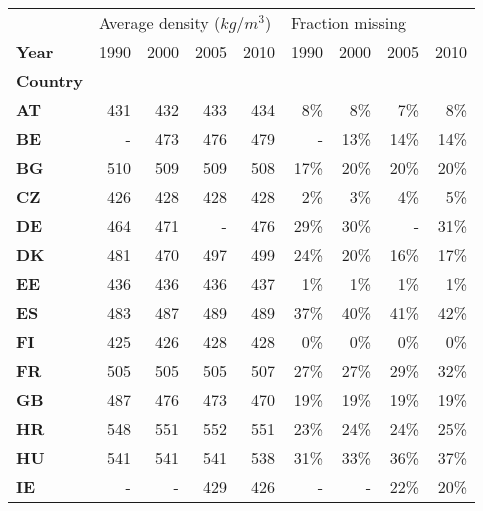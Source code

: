 \begin{tabular}{lrrrr|rrrr}
\toprule
{} & \multicolumn{4}{l}{Average density ($kg/m^3$)} & \multicolumn{4}{l}{Fraction missing} \\
\textbf{Year} &                       1990 & 2000 & 2005 & 2010 &             1990 &  2000 &  2005 &  2010 \\
\textbf{Country} &                            &      &      &      &                  &       &       &       \\
\midrule
\textbf{AT     } &                        431 &  432 &  433 &  434 &              8\% &   8\% &   7\% &   8\% \\
\textbf{BE     } &                          - &  473 &  476 &  479 &                - &  13\% &  14\% &  14\% \\
\textbf{BG     } &                        510 &  509 &  509 &  508 &             17\% &  20\% &  20\% &  20\% \\
\textbf{CZ     } &                        426 &  428 &  428 &  428 &              2\% &   3\% &   4\% &   5\% \\
\textbf{DE     } &                        464 &  471 &    - &  476 &             29\% &  30\% &     - &  31\% \\
\textbf{DK     } &                        481 &  470 &  497 &  499 &             24\% &  20\% &  16\% &  17\% \\
\textbf{EE     } &                        436 &  436 &  436 &  437 &              1\% &   1\% &   1\% &   1\% \\
\textbf{ES     } &                        483 &  487 &  489 &  489 &             37\% &  40\% &  41\% &  42\% \\
\textbf{FI     } &                        425 &  426 &  428 &  428 &              0\% &   0\% &   0\% &   0\% \\
\textbf{FR     } &                        505 &  505 &  505 &  507 &             27\% &  27\% &  29\% &  32\% \\
\textbf{GB     } &                        487 &  476 &  473 &  470 &             19\% &  19\% &  19\% &  19\% \\
\textbf{HR     } &                        548 &  551 &  552 &  551 &             23\% &  24\% &  24\% &  25\% \\
\textbf{HU     } &                        541 &  541 &  541 &  538 &             31\% &  33\% &  36\% &  37\% \\
\textbf{IE     } &                          - &    - &  429 &  426 &                - &     - &  22\% &  20\% \\

\end{tabular}
